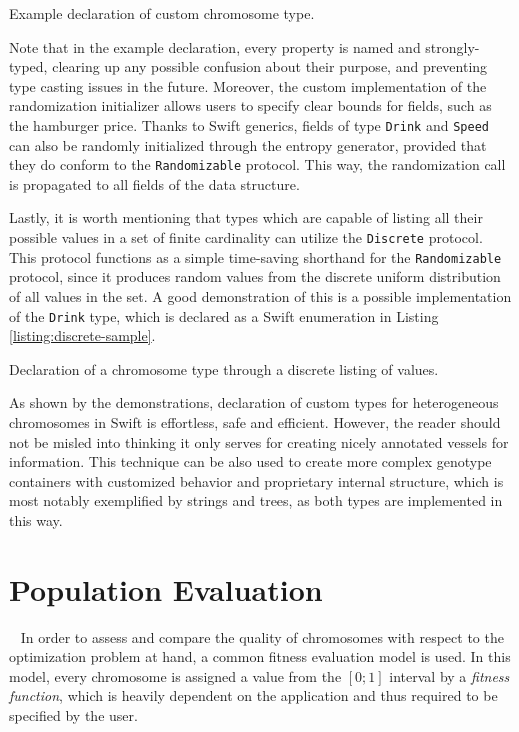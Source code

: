 \begin{listing}[ht]
	\caption{Example declaration of custom chromosome type.}
	\label{listing:hamburger-sample}
\end{listing}

Note that in the example declaration, every property is named and strongly-typed, clearing up any possible confusion about their purpose, and preventing type casting issues in the future. Moreover, the custom implementation of the randomization initializer allows users to specify clear bounds for fields, such as the hamburger price. Thanks to Swift generics, fields of type \texttt{Drink} and \texttt{Speed} can also be randomly initialized through the entropy generator, provided that they do conform to the \texttt{Randomizable} protocol. This way, the randomization call is propagated to all fields of the data structure.

Lastly, it is worth mentioning that types which are capable of listing all their possible values in a set of finite cardinality can utilize the \texttt{Discrete} protocol. This protocol functions as a simple time-saving shorthand for the \texttt{Randomizable} protocol, since it produces random values from the discrete uniform distribution of all values in the set. A good demonstration of this is a possible implementation of the \texttt{Drink} type, which is declared as a Swift enumeration in Listing \ref{listing:discrete-sample}.

\begin{listing}[ht]
	\caption{Declaration of a chromosome type through a discrete listing of values.}
	\label{listing:discrete-sample}
\end{listing}

As shown by the demonstrations, declaration of custom types for heterogeneous chromosomes in Swift is effortless, safe and efficient. However, the reader should not be misled into thinking it only serves for creating nicely annotated vessels for information. This technique can be also used to create more complex genotype containers with customized behavior and proprietary internal structure, which is most notably exemplified by strings and trees, as both types are implemented in this way.

\section{Population Evaluation}~\label{section:evaluation}
In order to assess and compare the quality of chromosomes with respect to the optimization problem at hand, a common fitness evaluation model is used. In this model, every chromosome is assigned a value from the $[0;1]$ interval by a \textit{fitness function}, which is heavily dependent on the application and thus required to be specified by the user.

